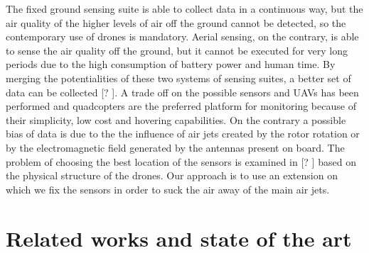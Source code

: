 The fixed ground sensing suite is able to collect data in a continuous way, but the air quality of the higher levels of air off the ground cannot be detected, so the contemporary use of drones is mandatory. Aerial sensing, on the contrary, is able to sense the air quality off the ground, but it cannot be executed for very long periods due to the high consumption of battery power and human time. By merging the potentialities of these two systems of sensing suites, a better set of data can be collected [? ]. A trade off on the possible sensors and UAVs has been performed and quadcopters are the preferred platform for monitoring because of their simplicity, low cost and hovering capabilities. On the contrary a possible bias of data is due to the the influence of air jets created by the rotor rotation or by the electromagnetic field generated by the antennas present on board. The problem of choosing the best location of the sensors is examined in [? ] based on the physical structure of the drones. Our approach is to use an extension on which we fix the sensors in order to suck the air away of the main air jets.
\section{Related works and state of the art}

